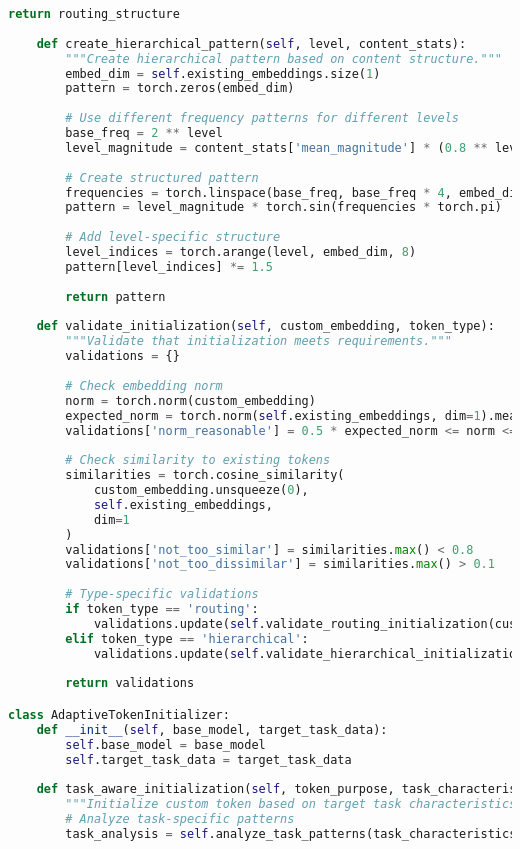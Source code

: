 \begin{lstlisting}[language=Python, caption=Advanced embedding initialization strategies]
        return routing_structure
    
    def create_hierarchical_pattern(self, level, content_stats):
        """Create hierarchical pattern based on content structure."""
        embed_dim = self.existing_embeddings.size(1)
        pattern = torch.zeros(embed_dim)
        
        # Use different frequency patterns for different levels
        base_freq = 2 ** level
        level_magnitude = content_stats['mean_magnitude'] * (0.8 ** level)
        
        # Create structured pattern
        frequencies = torch.linspace(base_freq, base_freq * 4, embed_dim)
        pattern = level_magnitude * torch.sin(frequencies * torch.pi)
        
        # Add level-specific structure
        level_indices = torch.arange(level, embed_dim, 8)
        pattern[level_indices] *= 1.5
        
        return pattern
    
    def validate_initialization(self, custom_embedding, token_type):
        """Validate that initialization meets requirements."""
        validations = {}
        
        # Check embedding norm
        norm = torch.norm(custom_embedding)
        expected_norm = torch.norm(self.existing_embeddings, dim=1).mean()
        validations['norm_reasonable'] = 0.5 * expected_norm <= norm <= 2.0 * expected_norm
        
        # Check similarity to existing tokens
        similarities = torch.cosine_similarity(
            custom_embedding.unsqueeze(0),
            self.existing_embeddings,
            dim=1
        )
        validations['not_too_similar'] = similarities.max() < 0.8
        validations['not_too_dissimilar'] = similarities.max() > 0.1
        
        # Type-specific validations
        if token_type == 'routing':
            validations.update(self.validate_routing_initialization(custom_embedding))
        elif token_type == 'hierarchical':
            validations.update(self.validate_hierarchical_initialization(custom_embedding))
        
        return validations

class AdaptiveTokenInitializer:
    def __init__(self, base_model, target_task_data):
        self.base_model = base_model
        self.target_task_data = target_task_data
        
    def task_aware_initialization(self, token_purpose, task_characteristics):
        """Initialize custom token based on target task characteristics."""
        # Analyze task-specific patterns
        task_analysis = self.analyze_task_patterns(task_characteristics)
        

\end{lstlisting}
